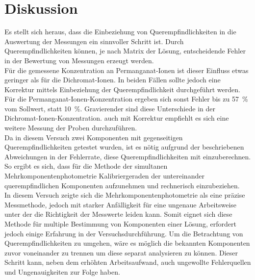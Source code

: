 \section{Diskussion}
\label{sec:diskussion}

Es stellt sich heraus, dass die Einbeziehung von Querempfindlichkeiten in die Auswertung der Messungen ein sinnvoller Schritt ist. Durch Querempfindlichkeiten können, je nach Matrix der Lösung, entscheidende Fehler in der Bewertung von Messungen erzeugt werden.\\
Für die gemessene Konzentration an Permanganat-Ionen ist dieser Einfluss etwas geringer als für die Dichromat-Ionen. In beiden Fällen sollte jedoch eine Korrektur mittels Einbeziehung der Querempfindlichkeit durchgeführt werden. Für die Permanganat-Ionen-Konzentration ergeben sich sonst Fehler bis zu \SI{57}{\percent} vom Sollwert, statt \SI{10}{\percent}. Gravierender sind diese Unterschiede in der Dichromat-Ionen-Konzentration. auch mit Korrektur empfiehlt es sich eine weitere Messung der Proben durchzuführen.\\
Da in diesem Versuch zwei Komponenten mit gegenseitigen Querempfindlichkeiten getestet wurden, ist es nötig aufgrund der beschriebenen Abweichungen in der Fehlerrate, diese Querempfindlichkeiten mit einzuberechnen. So ergibt es sich, dass für die Methode der simultanen Mehrkomponentenphotometrie  Kalibriergeraden der untereinander querempfindlichen Komponenten aufzunehmen und rechnerisch einzubeziehen. \\
In diesem Versuch zeigte sich die Mehrkomponentenphotometrie als eine präzise Messmethode, jedoch mit starker Anfälligkeit für eine ungenaue Arbeitsweise unter der die Richtigkeit der Messwerte leiden kann. Somit eignet sich diese Methode für multiple Bestimmung von Komponenten einer Lösung, erfordert jedoch einige Erfahrung in der Versuchsdurchführung.\linebreak
Um die Betrachtung von Querempfindlichkeiten zu umgehen, wäre es möglich die bekannten Komponenten zuvor voneinander zu trennen um diese separat analysieren zu können. Dieser Schritt kann, neben dem erhöhten Arbeitsaufwand, auch ungewollte Fehlerquellen und Ungenauigkeiten zur Folge haben.